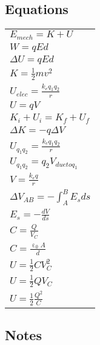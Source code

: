 \documentclass[12pt, letterpaper, twoside]{article}
\begin{document}
  \subsection*{Equations}
    \begin{tabular}{l}
      $E_{mech} = K + U$\\
      $W = qEd$\\
      $\Delta U = qEd$\\
      $K = \frac{1}{2} mv^2$\\
      $U_{elec} = \frac{k_e q_1 q_2}{r}$\\
      $U = qV$\\
      $K_i + U_i = K_f + U_f$\\
      $\Delta K = - q \Delta V$\\
      $U_{q_1 q_2} = \frac{k_e q_1 q_2}{r}$\\
      $U_{q_1 q_2} = q_2V_{due to q_1}$\\
      $V = \frac{k_e q}{r}$\\
      $\Delta V_{AB} = - \int_A^B E_s ds$\\
      $E_s = - \frac{dV}{ds}$\\
      $C = \frac{Q}{V_C}$\\
      $C = \frac{\upepsilon_0 A}{d}$\\
      $U = \frac{1}{2} CV_C^2$\\
      $U = \frac{1}{2} QV_C$\\
      $U = \frac{1}{2} \frac{Q^2}{C}$\\
      
      
    \end{tabular}
  
  \subsection*{Notes}
    
    
\end{document}
